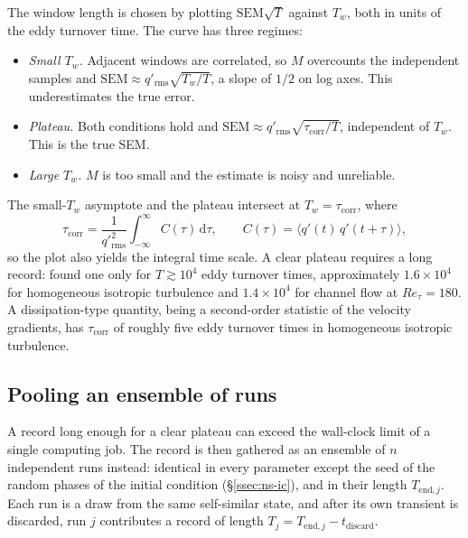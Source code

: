 \documentclass{article}
\begin{document}
The window length is chosen by plotting $\mathrm{SEM}\sqrt{T}$ against $T_w$,
both in units of the eddy turnover time. The curve has three regimes:
\begin{itemize}
  \item \emph{Small $T_w$.} Adjacent windows are correlated, so $M$ overcounts
  the independent samples and
  $\mathrm{SEM} \approx q'_{\mathrm{rms}} \sqrt{T_w / T}$, a slope of $1/2$
  on log axes. This underestimates the true error.
  \item \emph{Plateau.} Both conditions hold and
  $\mathrm{SEM} \approx q'_{\mathrm{rms}} \sqrt{\tau_{\mathrm{corr}} / T}$,
  independent of $T_w$. This is the true SEM.
  \item \emph{Large $T_w$.} $M$ is too small and the estimate is noisy and
  unreliable.
\end{itemize}
The small-$T_w$ asymptote and the plateau intersect at
$T_w = \tau_{\mathrm{corr}}$, where
\begin{equation}\label{eq:stat-tau-corr}
  \tau_{\mathrm{corr}} = \frac{1}{q'^2_{\mathrm{rms}}}
  \int_{-\infty}^{\infty} C(\tau)\, \mathrm{d}\tau ,
  \qquad
  C(\tau) = \langle q'(t)\, q'(t + \tau) \rangle ,
\end{equation}
so the plot also yields the integral time scale. A clear plateau requires a
long record: \cite{shirian2023convergence} found one only for
$T \gtrsim 10^4$ eddy turnover times, approximately $1.6 \times 10^4$ for
homogeneous isotropic turbulence and $1.4 \times 10^4$ for channel flow at
$Re_\tau = 180$. A dissipation-type quantity, being a second-order statistic of
the velocity gradients, has $\tau_{\mathrm{corr}}$ of roughly five eddy
turnover times in homogeneous isotropic turbulence.

\subsection{Pooling an ensemble of runs}\label{ssec:stat-ensemble}

A record long enough for a clear plateau can exceed the wall-clock limit of a
single computing job. The record is then gathered as an ensemble of $n$
independent runs instead: identical in every parameter except the seed of the
random phases of the initial condition (\S\ref{ssec:ns-ic}), and in their
length $T_{\mathrm{end},j}$. Each run is a draw from the same self-similar
state, and after its own transient is discarded, run $j$ contributes a record
of length $T_j = T_{\mathrm{end},j} - t_{\mathrm{discard}}$.
\end{document}
